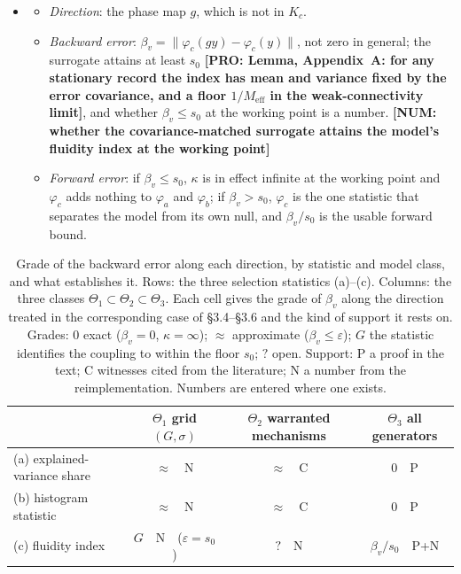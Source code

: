 \documentclass[11pt]{article}
\newcommand{\NUM}[1]{\textcolor{red!70!black}{\textbf{[NUM: #1]}}}
\newcommand{\PRO}[1]{\textcolor{blue!55!black}{\textbf{[PRO: #1]}}}
\begin{document}
\begin{itemize}
\begin{itemize}
  \end{itemize}
\item[$\Theta_3$]
  \begin{itemize}
  \item \emph{Direction}: the phase map $g$, which is not in $K_c$.
  \item \emph{Backward error}: $\beta_v=\|\varphi_c(gy)-\varphi_c(y)\|$, not zero in general; the surrogate attains at least $s_0$ \PRO{Lemma, Appendix~A: for any stationary record the index has mean and variance fixed by the error covariance, and a floor $1/M_{\mathrm{eff}}$ in the weak-connectivity limit}, and whether $\beta_v\le s_0$ at the working point is a number. \NUM{whether the covariance-matched surrogate attains the model's fluidity index at the working point}
  \item \emph{Forward error}: if $\beta_v\le s_0$, $\kappa$ is in effect infinite at the working point and $\varphi_c$ adds nothing to $\varphi_a$ and $\varphi_b$; if $\beta_v>s_0$, $\varphi_c$ is the one statistic that separates the model from its own null, and $\beta_v/s_0$ is the usable forward bound.
  \end{itemize}
\end{itemize}

\begin{table}[htbp]\centering\small
\caption{Grade of the backward error along each direction, by statistic and model class, and what establishes it. Rows: the three selection statistics (a)--(c). Columns: the three classes $\Theta_1\subset\Theta_2\subset\Theta_3$. Each cell gives the grade of $\beta_v$ along the direction treated in the corresponding case of \S3.4--\S3.6 and the kind of support it rests on. Grades: $0$ exact ($\beta_v=0$, $\kappa=\infty$); $\approx$ approximate ($\beta_v\le\varepsilon$); $G$ the statistic identifies the coupling to within the floor $s_0$; $?$ open. Support: P a proof in the text; C witnesses cited from the literature; N a number from the reimplementation. Numbers are entered where one exists.}
\label{tab:grid}
\renewcommand{\arraystretch}{1.25}
\begin{tabular}{@{}l ccc@{}}
\toprule
 & $\Theta_1$ grid $(G,\sigma)$ & $\Theta_2$ warranted mechanisms & $\Theta_3$ all generators \\
\midrule
(a) explained-variance share & $\approx$\ \ N & $\approx$\ \ C & $0$\ \ P \\
(b) histogram statistic      & $\approx$\ \ N & $\approx$\ \ C & $0$\ \ P \\
(c) fluidity index           & $G$\ \ N\ \ ($\varepsilon=s_0$) & $?$\ \ N & $\beta_v/s_0$\ \ P+N \\
\bottomrule
\end{tabular}
\end{table}
\end{document}
